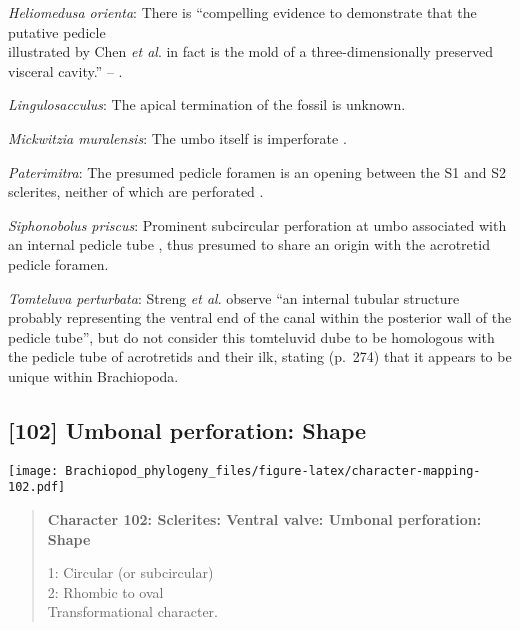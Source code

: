 \documentclass[openany]{book}
\theoremstyle{definition}
\theoremstyle{definition}
\theoremstyle{definition}
\theoremstyle{remark}
\begin{document}
\hypertarget{Heliomedusa_orienta-coding-101}{}
\emph{Heliomedusa orienta}: There is ``compelling evidence to
demonstrate that the putative pedicle\\
illustrated by Chen \emph{et al}. \citeyearpar[Figs. 4, 6,
7]{Chen2007Reinterpretationof} in fact is the mold of a
three-dimensionally preserved visceral cavity.'' --
\citet{Zhang2009Architectureand}.

\hypertarget{Lingulosacculus-coding-101}{}
\emph{Lingulosacculus}: The apical termination of the fossil is unknown.

\hypertarget{Mickwitzia_muralensis-coding-101}{}
\emph{Mickwitzia muralensis}: The umbo itself is imperforate
\citep{Balthasar2004Shellstructure}.

\hypertarget{Paterimitra-coding-101}{}
\emph{Paterimitra}: The presumed pedicle foramen is an opening between
the S1 and S2 sclerites, neither of which are perforated
\citep{Skovsted2009Thescleritome}.

\hypertarget{Siphonobolus_priscus-coding-101}{}
\emph{Siphonobolus priscus}: Prominent subcircular perforation at umbo
associated with an internal pedicle tube \citep{Popov2009Earlyontogeny},
thus presumed to share an origin with the acrotretid pedicle foramen.

\hypertarget{Tomteluva_perturbata-coding-101}{}
\emph{Tomteluva perturbata}: Streng \emph{et al}.
\citeyearpar{Streng2016Anew} observe ``an internal tubular structure
probably representing the ventral end of the canal within the posterior
wall of the pedicle tube'', but do not consider this tomteluvid dube to
be homologous with the pedicle tube of acrotretids and their ilk,
stating (p.~274) that it appears to be unique within Brachiopoda.

\subsection*{{[}102{]} Umbonal perforation:
Shape}\label{umbonal-perforation-shape}

\texttt{[image: Brachiopod\_phylogeny\_files/figure-latex/character-mapping-102.pdf]}

\begin{quote}
\textbf{Character 102: Sclerites: Ventral valve: Umbonal perforation:
Shape}

1: Circular (or subcircular)\\
2: Rhombic to oval\\
Transformational character.
\end{quote}
\end{document}
